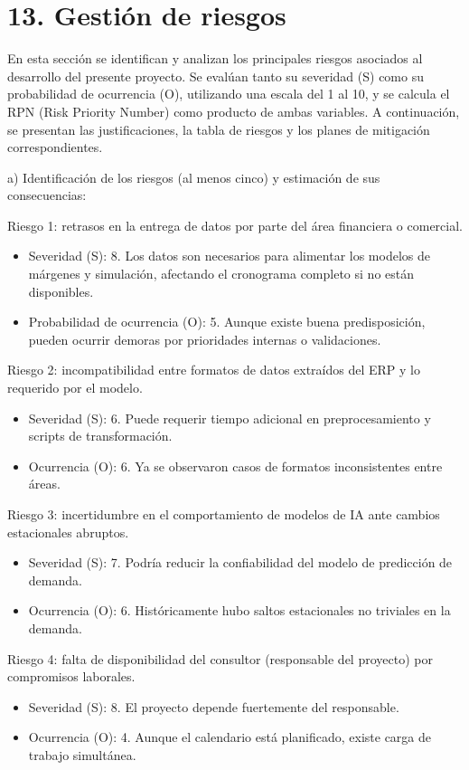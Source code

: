 \documentclass[
11pt, %
]{charter}
\begin{document}
\section{13. Gestión de riesgos}
\label{sec:riesgos}

En esta sección se identifican y analizan los principales riesgos asociados al desarrollo del presente proyecto. Se evalúan tanto su severidad (S) como su probabilidad de ocurrencia (O), utilizando una escala del 1 al 10, y se calcula el RPN (Risk Priority Number) como producto de ambas variables. A continuación, se presentan las justificaciones, la tabla de riesgos y los planes de mitigación correspondientes.

a) Identificación de los riesgos (al menos cinco) y estimación de sus consecuencias:


Riesgo 1: retrasos en la entrega de datos por parte del área financiera o comercial.
\begin{itemize}
	\item Severidad (S): 8. Los datos son necesarios para alimentar los modelos de márgenes y simulación, afectando el cronograma completo si no están disponibles.
	\item Probabilidad de ocurrencia (O): 5. Aunque existe buena predisposición, pueden ocurrir demoras por prioridades internas o validaciones.\\
\end{itemize}   

Riesgo 2: incompatibilidad entre formatos de datos extraídos del ERP y lo requerido por el modelo.
\begin{itemize}
	\item Severidad (S): 6. Puede requerir tiempo adicional en preprocesamiento y scripts de transformación.
	\item Ocurrencia (O): 6. Ya se observaron casos de formatos inconsistentes entre áreas.
\end{itemize}

Riesgo 3: incertidumbre en el comportamiento de modelos de IA ante cambios estacionales abruptos.
\begin{itemize}
	\item Severidad (S):  7. Podría reducir la confiabilidad del modelo de predicción de demanda.
	\item Ocurrencia (O): 6. Históricamente hubo saltos estacionales no triviales en la demanda.
\end{itemize}

Riesgo 4: falta de disponibilidad del consultor (responsable del proyecto) por compromisos laborales.
\begin{itemize}
	\item Severidad (S):  8. El proyecto depende fuertemente del responsable.
	\item Ocurrencia (O): 4. Aunque el calendario está planificado, existe carga de trabajo simultánea.
\end{itemize}
\end{document}
